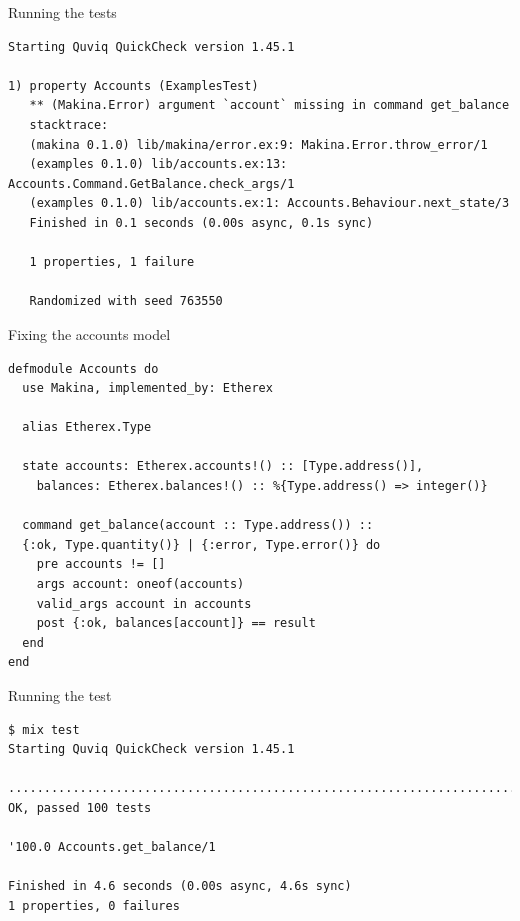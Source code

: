\documentclass[aspectratio=169, 10pt]{beamer}
\begin{document}
\begin{frame}[label={sec:orgfce22fd},fragile]{Running the tests}
 \lstset{language=shell,label= ,caption= ,captionpos=b,numbers=none,style=display}
\begin{lstlisting}
Starting Quviq QuickCheck version 1.45.1

1) property Accounts (ExamplesTest)
   ** (Makina.Error) argument `account` missing in command get_balance
   stacktrace:
   (makina 0.1.0) lib/makina/error.ex:9: Makina.Error.throw_error/1
   (examples 0.1.0) lib/accounts.ex:13: Accounts.Command.GetBalance.check_args/1
   (examples 0.1.0) lib/accounts.ex:1: Accounts.Behaviour.next_state/3
   Finished in 0.1 seconds (0.00s async, 0.1s sync)

   1 properties, 1 failure

   Randomized with seed 763550
\end{lstlisting}
\end{frame}


\begin{frame}[label={sec:orga9f891c},fragile]{Fixing the accounts model}
 \lstset{language=elixir,label= ,caption= ,captionpos=b,numbers=none,style=display}
\begin{lstlisting}
defmodule Accounts do
  use Makina, implemented_by: Etherex

  alias Etherex.Type

  state accounts: Etherex.accounts!() :: [Type.address()],
    balances: Etherex.balances!() :: %{Type.address() => integer()}

  command get_balance(account :: Type.address()) ::
  {:ok, Type.quantity()} | {:error, Type.error()} do
    pre accounts != []
    args account: oneof(accounts)
    valid_args account in accounts
    post {:ok, balances[account]} == result
  end
end
\end{lstlisting}
\end{frame}


\begin{frame}[label={sec:org2318515},fragile]{Running the test}
 \lstset{language=shell,label= ,caption= ,captionpos=b,numbers=none,style=display}
\begin{lstlisting}
$ mix test
Starting Quviq QuickCheck version 1.45.1

....................................................................................................
OK, passed 100 tests

'100.0 Accounts.get_balance/1

Finished in 4.6 seconds (0.00s async, 4.6s sync)
1 properties, 0 failures
\end{lstlisting}
\end{frame}
\end{document}
